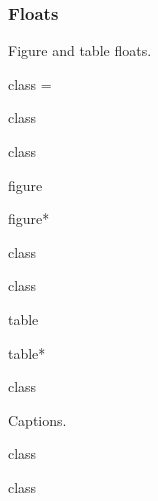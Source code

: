 \documentclass{skdoc}
\begin{document}
	\subsubsection{Floats}
	Figure and table floats.
\begin{MacroCode}{class}
\setlength{}
\setlength{}
\setlength{}
\setlength{}
\setlength{}
\skip\@mpfootins=\skip\footins
\setlength{}
\setlength{}
\end{MacroCode}
	\begin{macro*}{\theequation}
\begin{MacroCode}{class}
\renewcommand\theequation{\@arabic\c@equation}
\end{MacroCode}
	\end{macro*}
\begin{MacroCode}{class}
\renewcommand\thefigure{\@arabic\c@figure}
\def\fps@figure{tb}
\def\ftype@figure{1}
\def\ext@figure{lof}
\def\fnum@figure{\figurename~\thefigure}
\end{MacroCode}
	\begin{environment}{figure}
	\begin{environment*}{figure*}
\begin{MacroCode}{class}
\newenvironment{figure}{\@float{figure}}{\end@float}
\newenvironment{figure*}{\@dblfloat{figure}}{\end@dblfloat}
\end{MacroCode}
	\end{environment*}
	\end{environment}
\begin{MacroCode}{class}
\renewcommand\thetable{\@arabic\c@table}
\def\fps@table{tb}
\def\ftype@table{2}
\def\ext@table{lot}
\def\fnum@table{\tablename~\thetable}
\end{MacroCode}
	\begin{environment}{table}
	\begin{environment*}{table*}
\begin{MacroCode}{class}
\newenvironment{table}{\@float{table}}{\end@float}
\newenvironment{table*}{\@dblfloat{table}}{\end@dblfloat}
\end{MacroCode}
	\end{environment*}
	\end{environment}

	Captions.
\begin{MacroCode}{class}
\let\@captionstyle\relax
\newlength\abovecaptionskip\setlength{}
\newlength\belowcaptionskip\setlength{}
\end{MacroCode}
	\begin{macro*}{\@makecaption}
\begin{MacroCode}{class}
\long\def\@makecaption#1#2{%
	\vskip\abovecaptionskip
	\sbox\@tempboxa{\small{\bfseries#1:} \itshape#2}%
	\ifdim \wd\@tempboxa >\hsize
		\small{\bfseries\@captionstyle#1:} \itshape#2\par
	\else
		\global \@minipagefalse
		\hb@xt@\hsize{\hfil\box\@tempboxa\hfil}%
	\fi
	\vskip\belowcaptionskip}
\end{MacroCode}
	\end{macro*}
\end{document}
